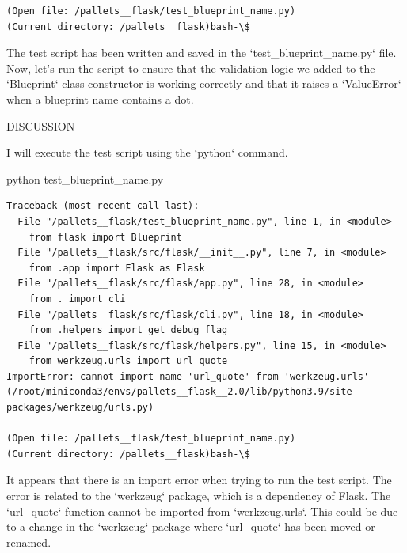 {\begin{observationbox}
\begin{Verbatim}[breaklines=true, breakanywhere=true]
(Open file: /pallets__flask/test_blueprint_name.py)
(Current directory: /pallets__flask)bash-\$
\end{Verbatim}
\end{observationbox}
\begin{agentbox}
The test script has been written and saved in the `test\_blueprint\_name.py` file. Now, let's run the script to ensure that the validation logic we added to the `Blueprint` class constructor is working correctly and that it raises a `ValueError` when a blueprint name contains a dot.



DISCUSSION

I will execute the test script using the `python` command.



\hrulefill
\begin{CodeVerbatim}[breaklines=true, breakanywhere=true]
python test_blueprint_name.py
\end{CodeVerbatim}
\end{agentbox}
\begin{observationbox}\begin{Verbatim}[breaklines=true, breakanywhere=true]
Traceback (most recent call last):
  File "/pallets__flask/test_blueprint_name.py", line 1, in <module>
    from flask import Blueprint
  File "/pallets__flask/src/flask/__init__.py", line 7, in <module>
    from .app import Flask as Flask
  File "/pallets__flask/src/flask/app.py", line 28, in <module>
    from . import cli
  File "/pallets__flask/src/flask/cli.py", line 18, in <module>
    from .helpers import get_debug_flag
  File "/pallets__flask/src/flask/helpers.py", line 15, in <module>
    from werkzeug.urls import url_quote
ImportError: cannot import name 'url_quote' from 'werkzeug.urls' (/root/miniconda3/envs/pallets__flask__2.0/lib/python3.9/site-packages/werkzeug/urls.py)

(Open file: /pallets__flask/test_blueprint_name.py)
(Current directory: /pallets__flask)bash-\$
\end{Verbatim}
\end{observationbox}
\begin{agentbox}
It appears that there is an import error when trying to run the test script. The error is related to the `werkzeug` package, which is a dependency of Flask. The `url\_quote` function cannot be imported from `werkzeug.urls`. This could be due to a change in the `werkzeug` package where `url\_quote` has been moved or renamed.




\end{agentbox}}
